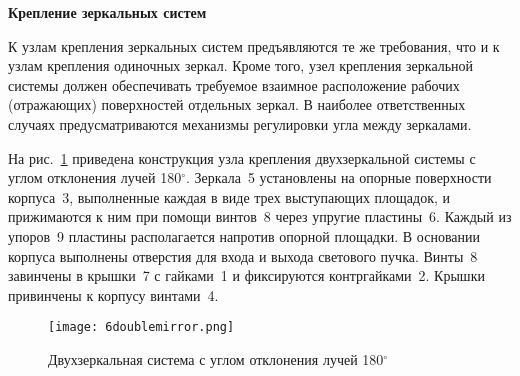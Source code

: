 \begin{flushleft}
	\textbf{Крепление зеркальных систем}
\end{flushleft}

К узлам крепления зеркальных систем предъявляются те же требования, что и к узлам крепления одиночных зеркал. Кроме того, узел крепления зеркальной системы должен обеспечивать требуемое взаимное расположение рабочих (отражающих) поверхностей отдельных зеркал. В наиболее ответственных случаях предусматриваются механизмы регулировки угла между зеркалами.

На рис.~\ref{pic:6doublemirror} приведена конструкция узла крепления двухзеркальной системы с углом отклонения лучей 180$ ^\circ $. Зеркала~5 установлены на опорные поверхности корпуса~3, выполненные каждая в виде трех выступающих площадок, и прижимаются к ним при помощи винтов~8 через упругие пластины~6. Каждый из упоров~9 пластины располагается напротив опорной площадки. В основании корпуса выполнены отверстия для входа и выхода светового пучка. Винты~8 завинчены в крышки~7 с гайками~1 и фиксируются контргайками~2. Крышки привинчены к корпусу винтами~4.

\begin{figure}[h!]
	\caption{ Двухзеркальная система с углом отклонения лучей 180$ ^\circ $ }
	\texttt{[image: 6doublemirror.png]}
	\label{pic:6doublemirror}
\end{figure}


